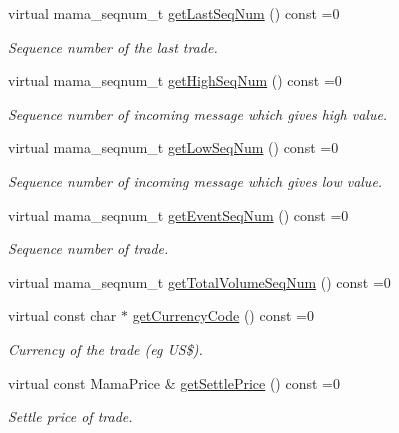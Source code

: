 \begin{CompactItemize}
virtual mama\_\-seqnum\_\-t \hyperlink{classWombat_1_1MamdaTradeRecap_ce7f7d8ec0c4d3df1905f7f68c16d42b}{get\-Last\-Seq\-Num} () const =0
\begin{CompactList}\small\item\em Sequence number of the last trade. \item\end{CompactList}\item 
virtual mama\_\-seqnum\_\-t \hyperlink{classWombat_1_1MamdaTradeRecap_f87da76851c02f0248c635836b7260ae}{get\-High\-Seq\-Num} () const =0
\begin{CompactList}\small\item\em Sequence number of incoming message which gives high value. \item\end{CompactList}\item 
virtual mama\_\-seqnum\_\-t \hyperlink{classWombat_1_1MamdaTradeRecap_459c619eee736e8cfc32f4ff45873d16}{get\-Low\-Seq\-Num} () const =0
\begin{CompactList}\small\item\em Sequence number of incoming message which gives low value. \item\end{CompactList}\item 
virtual mama\_\-seqnum\_\-t \hyperlink{classWombat_1_1MamdaTradeRecap_51ff9ff94e560b2dfbf16fd4ca64cdb6}{get\-Event\-Seq\-Num} () const =0
\begin{CompactList}\small\item\em Sequence number of trade. \item\end{CompactList}\item 
virtual mama\_\-seqnum\_\-t \hyperlink{classWombat_1_1MamdaTradeRecap_8474365e849b98332d5d9762347e5aae}{get\-Total\-Volume\-Seq\-Num} () const =0
\item 
virtual const char $\ast$ \hyperlink{classWombat_1_1MamdaTradeRecap_6587bdc84af742abd6cbb742737cc6db}{get\-Currency\-Code} () const =0
\begin{CompactList}\small\item\em Currency of the trade (eg US\$). \item\end{CompactList}\item 
virtual const Mama\-Price \& \hyperlink{classWombat_1_1MamdaTradeRecap_859bb4a768932a59460651ade04e4b81}{get\-Settle\-Price} () const =0
\begin{CompactList}\small\item\em Settle price of trade. \item\end{CompactList}\item 

\end{CompactItemize}
